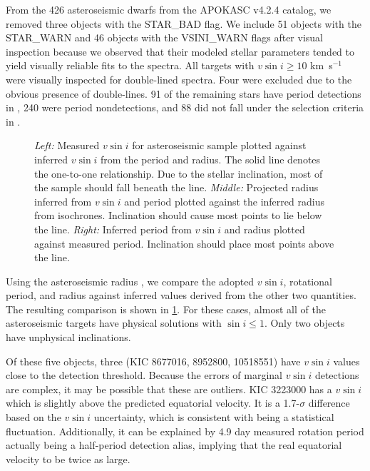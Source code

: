 \documentclass[manuscript]{aastex6}
\newcommand{\vsini}{\ensuremath{v \sin i}}
\newcommand{\kms}{\textrm{ km~s}\ensuremath{^{-1}}}
\begin{document}
From the 426 asteroseismic dwarfs from the APOKASC v4.2.4 catalog, we removed 
three objects with the STAR\_BAD flag. We include 51 objects with 
the STAR\_WARN and 46 objects with the VSINI\_WARN flags after visual 
inspection because we observed that their modeled stellar parameters tended to
yield visually reliable fits to the spectra.  All targets with \(\vsini \ge
10\) \kms{} were visually
inspected for double-lined spectra. Four were excluded due to the obvious
presence of double-lines. 91 of the remaining stars have period detections in 
\citet{McQuillan14}, 240 were period nondetections, and 88 did not fall under 
the selection criteria in \citet{McQuillan14}. 

\begin{figure}
    \caption{\emph{Left:} Measured \vsini{} for asteroseismic sample plotted
        against inferred \vsini{} from the period and radius. The solid line 
        denotes the one-to-one relationship. Due to the stellar inclination, most
        of the sample should fall beneath the line. \emph{Middle:} Projected
        radius inferred from \vsini{} and period plotted against the inferred
        radius from isochrones. Inclination should cause most points to lie
        below the line. \emph{Right:} Inferred period from \vsini{} and radius
        plotted against measured period. Inclination should place most points
    above the line.\label{fig:astero_rot}}
\end{figure}

Using the asteroseismic radius \citep{Serenelli17}, we compare the adopted
\vsini{}, rotational period, and radius against inferred values derived from
the other two quantities. The resulting comparison is shown in
\cref{fig:astero_rot}. For these cases, almost all of the asteroseismic 
targets have physical solutions with \(\sin i \le 1\). Only two objects have
unphysical inclinations.

Of these five objects, three (KIC 8677016, 8952800, 10518551) have
\vsini{} values close to the detection threshold. Because the errors of 
marginal \vsini{} detections are complex, 
it may be possible that these are outliers. KIC 3223000 has a
\vsini{} which is slightly above the predicted equatorial velocity. It
is a 1.7-\(\sigma\) difference based on the \vsini{} uncertainty, which
is consistent with being a statistical fluctuation. Additionally, it can
be explained by 4.9 day measured rotation period actually being a 
half-period detection alias, implying that the real equatorial velocity to be twice 
as large. 
\end{document}
